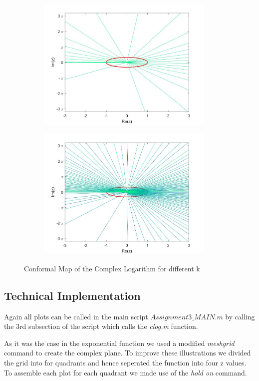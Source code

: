 \documentclass[a4paper,11pt]{article}
\begin{document}
\begin{figure}[!h]
\begin{subfigure}[c]{0.5\textwidth}
\includegraphics[width=8.5cm]{plot51_log.jpeg}
\end{subfigure}
\begin{subfigure}[c]{0.5\textwidth}
\includegraphics[width=8.5cm]{plot52_log.jpeg}
\end{subfigure}
\caption{Conformal Map of the Complex Logarithm for different k}
\label{logcont34}
\end{figure}
\newpage


\subsection{Technical Implementation}
Again all plots can be called in the main script \textit{$Assignment3\_MAIN.m$} by calling the 3rd subsection of the script which calls the \textit{clog.m} function.

As it was the case in the exponential function we used a modified \textit{meshgrid} command to create the complex plane. To improve these illustrations we divided the grid into for quadrants and hence seperated the function into four z values. To assemble each plot for each quadrant we made use of the \textit{hold on} command.
\end{document}

